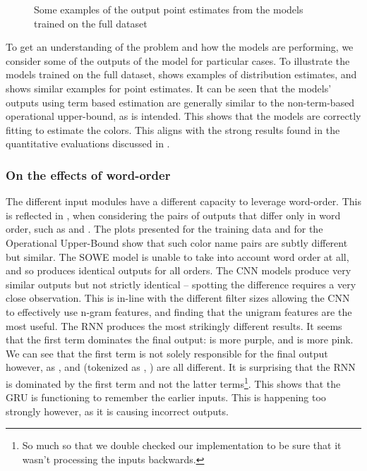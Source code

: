 \documentclass[11pt,a4paper]{article}
\begin{document}
\begin{figure}
	\caption{Some examples of the output point estimates from the models trained on the full dataset} \label{fig:pointout}
\end{figure}


To get an understanding of the problem and how the models are performing, we consider some of the outputs of the model for particular cases.
To illustrate the models trained on the full dataset,  shows examples of distribution estimates, and 
 shows similar examples for point estimates.
It can be seen that the models' outputs using term based estimation are generally similar to the non-term-based operational upper-bound, as is intended.
This shows that the models are correctly fitting to estimate the colors.
This aligns with the strong results found in the quantitative evaluations discussed in .

\subsubsection{On the effects of word-order}
The different input modules have a different capacity to leverage word-order.
This is reflected in ,
when considering the pairs of outputs that differ only in word order, such as  and .
The plots presented for the training data and for the Operational Upper-Bound show that such color name pairs are subtly different but similar.
The SOWE model is unable to take into account word order at all, and so produces identical outputs for all orders.
The CNN models produce very similar outputs but not strictly identical -- spotting the difference requires a very close observation.
This is in-line with the different filter sizes allowing the CNN to effectively use n-gram features, and finding that the unigram features are the most useful.
The RNN produces the most strikingly different results.
It seems that the first term dominates the final output:  is more purple, and   is more pink.
We can see that the first term is not solely responsible for the final output however, as ,  and  (tokenized as , ) are all different.
It is surprising that the RNN is dominated by the first term and not the latter terms\footnote{So much so that we double checked our implementation to be sure that it wasn't processing the inputs backwards.}.
This shows that the GRU is functioning to remember the earlier inputs.
This is happening too strongly however, as it is causing incorrect outputs.
\end{document}
